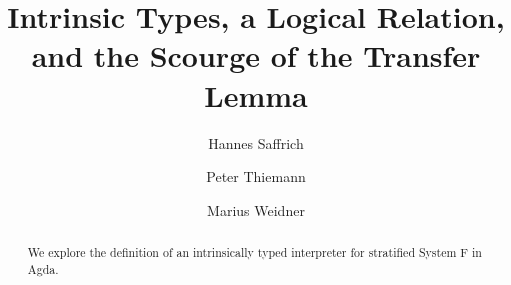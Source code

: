 \documentclass[acmsmall,anonymous,review,screen]{acmart}
\begin{document}
\title{Intrinsic Types, a Logical Relation, and the Scourge of the Transfer Lemma}

\author{Hannes Saffrich}


\author{Peter Thiemann}

\author{Marius Weidner}


\begin{abstract}
We explore the definition of an intrinsically typed interpreter for
stratified System F in Agda.
\end{abstract}
\end{document}
